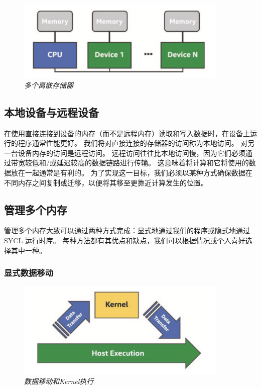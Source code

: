 \begin{figure}[H]
	\centering
	\includegraphics[width=0.9\textwidth]{figs/F3.1.png}
	\caption{\textit{多个离散存储器}}
\end{figure}

\subsection{本地设备与远程设备}
在使用直接连接到设备的内存（而不是远程内存）读取和写入数据时，在设备上运行的程序通常性能更好。 
我们将对直接连接的存储器的访问称为本地访问。 对另一台设备内存的访问是远程访问。 
远程访问往往比本地访问慢，因为它们必须通过带宽较低和/或延迟较高的数据链路进行传输。 
这意味着将计算和它将使用的数据放在一起通常是有利的。 
为了实现这一目标，我们必须以某种方式确保数据在不同内存之间复制或迁移，以便将其移至更靠近计算发生的位置。

\subsection{管理多个内存}
管理多个内存大致可以通过两种方式完成：显式地通过我们的程序或隐式地通过 SYCL 运行时库。 
每种方法都有其优点和缺点，我们可以根据情况或个人喜好选择其中一种。

\subsubsection{显式数据移动}
\begin{figure}[H]
	\centering
	\includegraphics[width=0.9\textwidth]{figs/F3.2.png}
	\caption{\textit{数据移动和Kernel执行}}
\end{figure}

